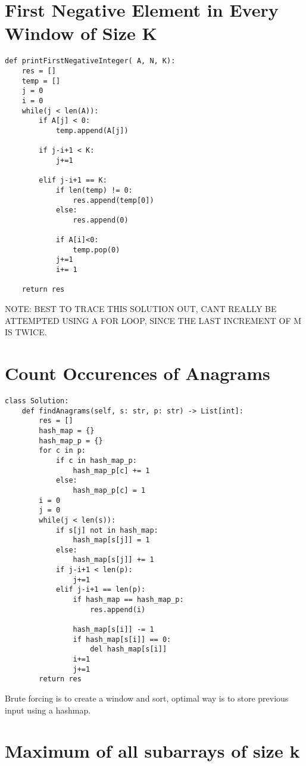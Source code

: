 \documentclass[a4]{article}
\begin{document}
\section{First Negative Element in Every Window of Size K}
\begin{lstlisting}
def printFirstNegativeInteger( A, N, K):
    res = []
    temp = []
    j = 0
    i = 0
    while(j < len(A)):
        if A[j] < 0:
            temp.append(A[j])
        
        if j-i+1 < K:
            j+=1
        
        elif j-i+1 == K:
            if len(temp) != 0:
                res.append(temp[0])
            else:
                res.append(0)
                
            if A[i]<0:
                temp.pop(0)
            j+=1    
            i+= 1
            
    return res
\end{lstlisting}

NOTE: BEST TO TRACE THIS SOLUTION OUT, CANT REALLY BE ATTEMPTED USING A FOR LOOP, SINCE THE LAST INCREMENT OF M IS TWICE.

\section{Count Occurences of Anagrams}
\begin{lstlisting}
class Solution:
    def findAnagrams(self, s: str, p: str) -> List[int]:
        res = []
        hash_map = {}
        hash_map_p = {}
        for c in p:
            if c in hash_map_p:
                hash_map_p[c] += 1
            else:
                hash_map_p[c] = 1
        i = 0
        j = 0
        while(j < len(s)):
            if s[j] not in hash_map:
                hash_map[s[j]] = 1
            else:
                hash_map[s[j]] += 1
            if j-i+1 < len(p):
                j+=1
            elif j-i+1 == len(p):
                if hash_map == hash_map_p:
                    res.append(i)
                
                hash_map[s[i]] -= 1
                if hash_map[s[i]] == 0:
                    del hash_map[s[i]]
                i+=1
                j+=1
        return res
\end{lstlisting}

Brute forcing is to create a window and sort, optimal way is to store previous input using a hashmap.

\newpage
\section{Maximum of all subarrays of size k}
\end{document}
